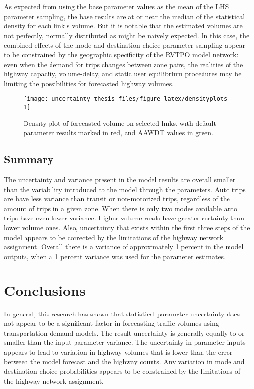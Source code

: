 \documentclass[fancy, masters,twoside]{byuthesis}
\begin{document}
As expected from using the base parameter values as the mean of the LHS parameter sampling, the base results are at or near the median of the statistical density for each link's volume. But it is notable that the estimated volumes are not perfectly, normally distributed as might be naively expected. In this case, the combined effects of the mode and destination choice parameter sampling appear to be constrained by the geographic specificity of the RVTPO model network: even when the demand for trips changes between zone pairs, the realities of the highway capacity, volume-delay, and static user equilibrium procedures may be limiting the possibilities for forecasted highway volumes.

\begin{sidewaysfigure}

{\centering \texttt{[image: uncertainty\_thesis\_files/figure-latex/densityplots-1]} 

}

\caption{Density plot of forecasted volume on selected links, with default parameter results marked in red, and AAWDT values in green.}\label{fig:densityplots}
\end{sidewaysfigure}

\hypertarget{summary-1}{%
\section{Summary}\label{summary-1}}

The uncertainty and variance present in the model results are overall smaller than the variability introduced to the model through the parameters. Auto trips are have less variance than transit or non-motorized trips, regardless of the amount of trips in a given zone. When there is only two modes available auto trips have even lower variance. Higher volume roads have greater certainty than lower volume ones. Also, uncertainty that exists within the first three steps of the model appears to be corrected by the limitations of the highway network assignment. Overall there is a variance of approximately 1 percent in the model outputs, when a 1 percent variance was used for the parameter estimates.

\hypertarget{conclusions}{%
\chapter{Conclusions}\label{conclusions}}

In general, this research has shown that statistical parameter uncertainty does not appear to be a significant factor in forecasting traffic volumes using transportation demand models. The result uncertainty is generally equally to or smaller than the input parameter variance. The uncertainty in parameter inputs appears to lead to variation in highway volumes that is lower than the error between the model forecast and the highway counts. Any variation in mode and destination choice probabilities appears to be constrained by the limitations of the highway network assignment.
\end{document}
